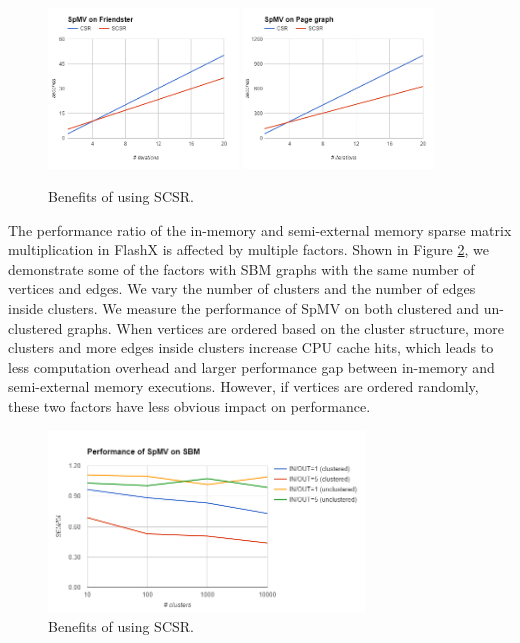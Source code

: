 \documentclass[simplex.tex]{subfiles}
\begin{document}
\begin{figure}[h!]
\begin{cframed}
\centering
\includegraphics[width=0.45\textwidth]{../../figs/SpMV-friendster.png}
\includegraphics[width=0.45\textwidth]{../../figs/SpMV-pagegraph.png}
\caption{
Benefits of using SCSR.
}
\label{fig:flashx1}
\end{cframed}
\end{figure}

The performance ratio of the in-memory and semi-external memory sparse
matrix multiplication in FlashX is affected by multiple factors. Shown
in Figure \ref{fig:flashx2}, we demonstrate some of the factors with SBM
graphs with the same number of vertices and edges. We vary the number of
clusters and the number of edges inside clusters. We measure the
performance of SpMV on both clustered and un-clustered graphs. When
vertices are ordered based on the cluster structure, more clusters and
more edges inside clusters increase CPU cache hits, which leads to less
computation overhead and larger performance gap between in-memory and
semi-external memory executions. However, if vertices are ordered
randomly, these two factors have less obvious impact on performance.

\begin{figure}[h!]
\begin{cframed}
\centering
\includegraphics[width=0.75\textwidth]{../../figs/SpMV-sbm.png}
\caption{
Benefits of using SCSR.
}
\label{fig:flashx2}
\end{cframed}
\end{figure}
\end{document}
